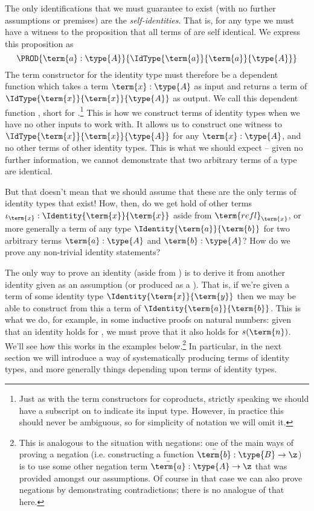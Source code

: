 The only identifications that we must guarantee to exist (with no further assumptions or premises) are the \emph{self-identities}.  That is, for any type  we must have a witness to the proposition that all terms of  are self identical.  We express this proposition as
\[
\PROD{\term{a}:\type{A}}{
\IdType{\term{a}}{\term{a}}{\type{A}}}
\]
The term constructor for the identity type must therefore be a dependent function which takes a term $\term{x}:\type{A}$ as input and returns a term of $\IdType{\term{x}}{\term{x}}{\type{A}}$ as output.  We call this dependent function , short for .\footnote{
Just as with the term constructors for coproducts, strictly speaking we should have a subscript on  to indicate its input type.  However, in practice this should never be ambiguous, so for simplicity of notation we will omit it.
}
This is how we construct terms of identity types when we have no other inputs to work with.  It allows us to construct one witness to $\IdType{\term{x}}{\term{x}}{\type{A}}$ for any $\term{x}:\type{A}$, and no other terms of other identity types.  This is what we should expect -- given no further information, we cannot demonstrate that two arbitrary terms of a type are identical.

But that doesn't mean that we should assume that these are the only terms of identity types that exist!  How, then, do we get hold of other terms $\iota_{\term{x}}:\Identity{\term{x}}{\term{x}}$ aside from $\term{refl}_{\term{x}}$, or more generally a term of any type 
$\Identity{\term{a}}{\term{b}}$ for two arbitrary terms $\term{a}:\type{A}$ and $\term{b}:\type{A}$?  How do we prove any non-trivial identity statements?  


The only way to prove an identity (aside from ) is to derive it from another identity given as an assumption (or produced as a ).  That is, if we're given a term of some identity type
$\Identity{\term{x}}{\term{y}}$ 
then we may be able to construct from this a term of
$\Identity{\term{a}}{\term{b}}$.  This is what we do, for example, in some inductive proofs on natural numbers: given that an identity holds for , we must prove that it also holds for $s(\term{n})$.  We'll see how this works in the examples below.\footnote{
This is analogous to the situation with negations: one of the main ways of proving a negation (i.e. constructing a function 
$\bar{\term{b}}:\type{B} \to \z$) is to use some other negation term
$\bar{\term{a}}:\type{A} \to \z$ that was provided amongst our assumptions.  Of course in that case we can also prove negations by demonstrating contradictions; there is no analogue of that here.
}  In particular, in the next section we will introduce a way of systematically producing terms of identity types, and more generally things depending upon terms of identity types.



